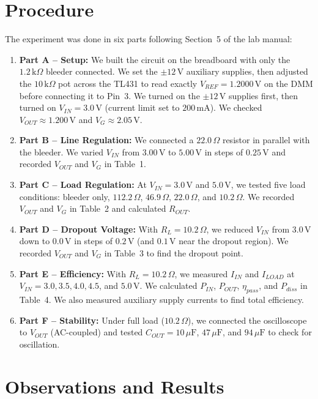 \documentclass[11pt,a4paper]{article}
\begin{document}
\section{Procedure}
The experiment was done in six parts following Section~5 of the lab manual:
\begin{enumerate}[leftmargin=1.5em, itemsep=0.2em]
    \item \textbf{Part A -- Setup:} We built the circuit on the breadboard with only the $1.2\,\text{k}\Omega$ bleeder connected. We set the $\pm 12\,\text{V}$ auxiliary supplies, then adjusted the $10\,\text{k}\Omega$ pot across the TL431 to read exactly $V_{REF} = 1.2000\,\text{V}$ on the DMM before connecting it to Pin~3. We turned on the $\pm 12\,\text{V}$ supplies first, then turned on $V_{IN} = 3.0\,\text{V}$ (current limit set to $200\,\text{mA}$). We checked $V_{OUT} \approx 1.200\,\text{V}$ and $V_G \approx 2.05\,\text{V}$.
    \item \textbf{Part B -- Line Regulation:} We connected a $22.0\,\Omega$ resistor in parallel with the bleeder. We varied $V_{IN}$ from $3.00\,\text{V}$ to $5.00\,\text{V}$ in steps of $0.25\,\text{V}$ and recorded $V_{OUT}$ and $V_G$ in Table~1.
    \item \textbf{Part C -- Load Regulation:} At $V_{IN} = 3.0\,\text{V}$ and $5.0\,\text{V}$, we tested five load conditions: bleeder only, $112.2\,\Omega$, $46.9\,\Omega$, $22.0\,\Omega$, and $10.2\,\Omega$. We recorded $V_{OUT}$ and $V_G$ in Table~2 and calculated $R_{OUT}$.
    \item \textbf{Part D -- Dropout Voltage:} With $R_L = 10.2\,\Omega$, we reduced $V_{IN}$ from $3.0\,\text{V}$ down to $0.0\,\text{V}$ in steps of $0.2\,\text{V}$ (and $0.1\,\text{V}$ near the dropout region). We recorded $V_{OUT}$ and $V_G$ in Table~3 to find the dropout point.
    \item \textbf{Part E -- Efficiency:} With $R_L = 10.2\,\Omega$, we measured $I_{IN}$ and $I_{LOAD}$ at $V_{IN} = 3.0, 3.5, 4.0, 4.5$, and $5.0\,\text{V}$. We calculated $P_{IN}$, $P_{OUT}$, $\eta_{pass}$, and $P_{diss}$ in Table~4. We also measured auxiliary supply currents to find total efficiency.
    \item \textbf{Part F -- Stability:} Under full load ($10.2\,\Omega$), we connected the oscilloscope to $V_{OUT}$ (AC-coupled) and tested $C_{OUT} = 10\,\mu\text{F}$, $47\,\mu\text{F}$, and $94\,\mu\text{F}$ to check for oscillation.
\end{enumerate}

\section{Observations and Results}
\end{document}
